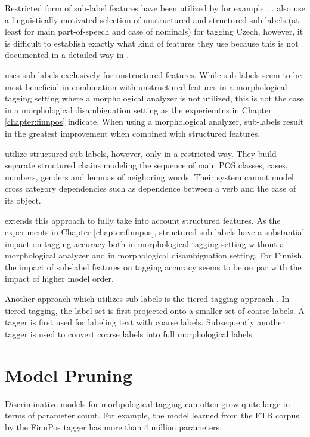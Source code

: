 Restricted form of sub-label features have been utilized by for
example \cite{Muller2013}, \cite{Smith2005}. \cite{Spoustova2009} also
use a linguistically motivated selection of unstructured and
structured sub-labels (at least for main part-of-speech and case of
nominals) for tagging Czech, however, it is difficult to establish
exactly what kind of features they use because this is not documented
in a detailed way in \cite{Spoustatova2009}.
 
\cite{Muller2013} uses sub-labels exclusively for unstructured
features. While sub-labels seem to be most beneficial in combination
with unstructured features in a morphological tagging setting where a
morphological analyzer is not utilized, this is not the case in a
morphological disambiguation setting as the experiemtns in Chapter
\ref{chapter:finnpos} indicate. When using a morphological analyzer,
sub-labels result in the greatest improvement when combined with
structured features.

\cite{Smith2015} utilize structured sub-labels, however, only in a
restricted way. They build separate structured chains modeling the
sequence of main POS classes, cases, numbers, genders and lemmas of
neighoring words. Their system cannot model cross category
dependencies such as dependence between a verb and the case of its
object.

\cite{Silfvererg2014} extends this approach to fully take
into account structured features. As the experiments in Chapter
\ref{chapter:finnpos}, structured sub-labels have a substantial impact
on tagging accuracy both in morphological tagging setting without a
morphological analyzer and in morphological disambiguation
setting. For Finnish, the impact of sub-label features on tagging
accuracy seems to be on par with the impact of higher model order.

Another approach which utilizes sub-labels is the tiered tagging
approach \citep{Tufis1999,Ceausu2006}. In tiered tagging, the label
set is first projected onto a smaller set of coarse labels. A tagger
is first used for labeling text with coarse labels. Subsequently
another tagger is used to convert coarse labels into full
morphological labels.

\section{Model Pruning}\label{sec:pruning}

Discriminative models for morhpological tagging can often grow quite
large in terms of parameter count. For example, the model learned from
the FTB corpus by the FinnPos tagger has more than 4 million
parameters.

